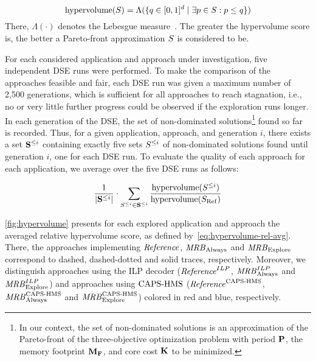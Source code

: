 \par
\begin{equation}\label{eq:hypervolume}
  \textup{hypervolume}(\ParetoFront) = \Lambda( \{ q\in [0,1]^d \mid \exists p \in \ParetoFront : p \leq q\} )
\end{equation}
There, $\Lambda(\cdot)$ denotes the Lebesgue measure~\cite{ciesielski1989good}.
The greater the hypervolume score is, the better a Pareto-front approximation $S$ is considered to be.
\par
For each considered application and approach under investigation, five independent \ac{DSE} runs were performed.
To make the comparison of the approaches feasible and fair, each \ac{DSE} run was given a maximum number of 2,500 generations, which is sufficient for all approaches to reach stagnation, i.e., no or very little further progress could be observed if the exploration runs longer.
In each generation of the \ac{DSE}, the set of non-dominated solutions\footnote{In our context, the set of non-dominated solutions is an approximation of the Pareto-front of the three-objective optimization problem with period  $\mathbf{P}$, the memory footprint $\mathbf{M_F}$, and core cost $\mathbf{K}$ to be minimized.} found so far is recorded.
Thus, for a given application, approach, and generation $i$, there exists a set $\mathbf{S}^{\leq i}$ containing exactly five sets $S^{\leq i}$ of non-dominated solutions found until generation $i$, one for each \ac{DSE} run.
To evaluate the quality of each approach for each application, we average over the five \ac{DSE} runs as follows:
\par
\begin{equation}\label{eq:hypervolume-rel-avg}
  \frac{1}{|\mathbf{\ParetoFront}^{\leq i}|}\cdot\sum_{\ParetoFront^{\leq i} \in \mathbf{\ParetoFront}^{\leq i}}\frac{\textup{hypervolume}(\ParetoFront^{\leq i})}{\textup{hypervolume}(\ParetoRef)}
\end{equation}
\par
\cref{fig:hypervolume} presents for each explored application and approach the averaged relative hypervolume score, as defined by~\cref{eq:hypervolume-rel-avg}.
There, the approaches implementing ${\it Reference}$, ${\it MRB}_{\mathrm{Always}}$\revised{,} and ${\it MRB}_{\mathrm{Explore}}$ correspond to dashed, dashed-dotted and solid traces, respectively.
Moreover, we distinguish approaches using the \ac{ILP} decoder (${\it Reference}^{ILP}$, ${\it MRB}_{\mathrm{Always}}^{ILP}$\revised{,} and ${\it MRB}_{\mathrm{Explore}}^{ILP}$) and approaches using $\textup{{CAPS-HMS}}$ (${\it Reference}^{\textup{{CAPS-HMS}}}$, ${\it MRB}_{\mathrm{Always}}^{\textup{{CAPS-HMS}}}$\revised{,} and ${\it MRB}_{\mathrm{Explore}}^{\textup{{CAPS-HMS}}}$) colored in red and blue, respectively.
